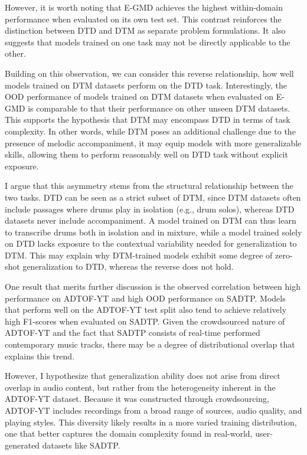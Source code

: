 However, it is worth noting that E-GMD achieves the highest within-domain performance when evaluated on its own test set. This contrast reinforces the distinction between \gls{DTD} and \gls{DTM} as separate problem formulations. It also suggests that models trained on one task may not be directly applicable to the other.

Building on this observation, we can consider this reverse relationship, how well models trained on \gls{DTM} datasets perform on the \gls{DTD} task. Interestingly, the \gls{OOD} performance of models trained on \gls{DTM} datasets when evaluated on E-GMD is comparable to that their performance on other unseen \gls{DTM} datasets. This supports the hypothesis that \gls{DTM} may encompass \gls{DTD} in terms of task complexity. In other words, while \gls{DTM} poses an additional challenge due to the presence of melodic accompaniment, it may equip models with more generalizable skills, allowing them to perform reasonably well on \gls{DTD} task without explicit exposure.

I argue that this asymmetry stems from the structural relationship between the two tasks. \gls{DTD} can be seen as a strict subset of \gls{DTM}, since \gls{DTM} datasets often include passages where drums play in isolation (e.g., drum solos), whereas \gls{DTD} datasets never include accompaniment. A model trained on \gls{DTM} can thus learn to transcribe drums both in isolation and in mixture, while a model trained solely on \gls{DTD} lacks exposure to the contextual variability needed for generalization to \gls{DTM}. This may explain why \gls{DTM}-trained models exhibit some degree of zero-shot generalization to \gls{DTD}, whereas the reverse does not hold.

One result that merits further discussion is the observed correlation between high performance on ADTOF-YT and high \gls{OOD} performance on SADTP. Models that perform well on the ADTOF-YT test split also tend to achieve relatively high F1-scores when evaluated on SADTP. Given the crowdsourced nature of ADTOF-YT and the fact that SADTP consists of real-time performed contemporary music tracks, there may be a degree of distributional overlap that explains this trend.

However, I hypothesize that generalization ability does not arise from direct overlap in audio content, but rather from the heterogeneity inherent in the ADTOF-YT dataset. Because it was constructed through crowdsourcing, ADTOF-YT includes recordings from a broad range of sources, audio quality, and playing styles. This diversity likely results in a more varied training distribution, one that better captures the domain complexity found in real-world, user-generated datasets like SADTP.

